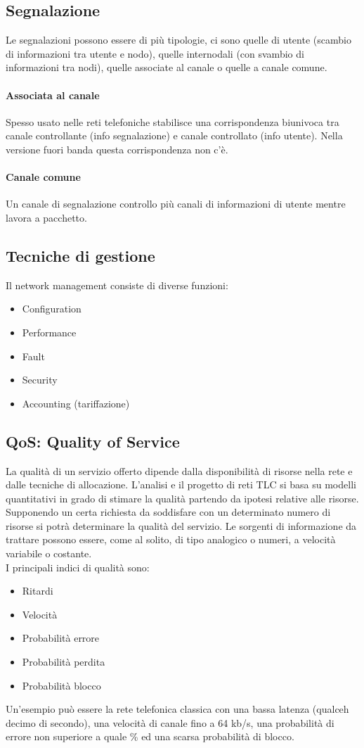 \documentclass[12pt]{article}
\begin{document}
\subsection{Segnalazione}
Le segnalazioni possono essere di più tipologie, ci sono quelle di utente (scambio di informazioni tra utente e nodo), quelle internodali (con svambio di informazioni tra nodi), quelle associate al canale o quelle a canale comune.
\paragraph{Associata al canale}
Spesso usato nelle reti telefoniche stabilisce una corrispondenza biunivoca tra canale controllante (info segnalazione) e canale controllato (info utente). Nella versione fuori banda questa corrispondenza non c'è.
\paragraph{Canale comune}
Un canale di segnalazione controllo più canali di informazioni di utente mentre lavora a pacchetto.

\subsection{Tecniche di gestione}
Il network management consiste di diverse funzioni:
\begin{itemize}
  \item Configuration
  \item Performance
  \item Fault
  \item Security
  \item Accounting (tariffazione)
\end{itemize}

\subsection{QoS: Quality of Service}
La qualità di un servizio offerto dipende dalla disponibilità di risorse nella rete e dalle tecniche di allocazione. L'analisi e il progetto di reti TLC si basa su modelli quantitativi in grado di stimare la qualità partendo da ipotesi relative alle risorse.\\
Supponendo un certa richiesta da soddisfare con un determinato numero di risorse si potrà determinare la qualità del servizio. Le sorgenti di informazione da trattare possono essere, come al solito, di tipo analogico o numeri, a velocità variabile o costante.\\
I principali indici di qualità sono:
\begin{itemize}
  \item Ritardi
  \item Velocità
  \item Probabilità errore
  \item Probabilità perdita
  \item Probabilità blocco
\end{itemize}
Un'esempio può essere la rete telefonica classica con una bassa latenza (qualceh decimo di secondo), una velocità di canale fino a 64 kb/s, una probabilità di errore non superiore a quale \% ed una scarsa probabilità di blocco.
\end{document}
